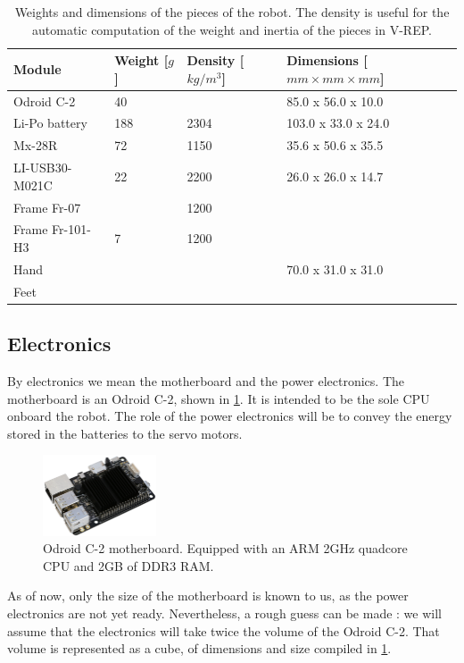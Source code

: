 \begin{table}[htp]
\center
\begin{tabularx}{\textwidth}{@{} l X X l @{}}
\toprule
\textbf{Module} & \textbf{Weight [$g$]} &  \textbf{Density [$kg/m^3$]}& \textbf{Dimensions [$mm \times mm \times mm$]}\\ 
\midrule
Odroid C-2 & 40 &  & 85.0 x 56.0 x 10.0\\
Li-Po battery & 188 & 2304 & 103.0 x 33.0 x 24.0\\
Mx-28R & 72 & 1150 & 35.6 x 50.6 x 35.5\\
LI-USB30-M021C & 22 & 2200 & 26.0 x 26.0 x 14.7\\
Frame Fr-07 & & 1200 & \\
Frame Fr-101-H3 & 7 & 1200 & \\
Hand & & & 70.0 x 31.0 x 31.0\\
Feet & & & \\
\bottomrule
\end{tabularx}
\caption[Weights and dimensions of the pieces of the robot]{Weights and dimensions of the pieces of the robot. The density is useful for the automatic computation of the weight and inertia of the pieces in V-REP.}
\label{table:weights}
\end{table}

\subsection{Electronics}
By electronics we mean the motherboard and the power electronics. The motherboard is an Odroid C-2, shown in \cref{fig:electronics}. It is intended to be the sole CPU onboard the robot. The role of the power electronics will be to convey the energy stored in the batteries to the servo motors. 

\begin{figure}[htp]
\center
\includegraphics[width=0.3\textwidth]{figures/odroid-c2}
\caption{Odroid C-2 motherboard. Equipped with an ARM 2GHz quadcore CPU and 2GB of DDR3 RAM.}
\label{fig:electronics}
\end{figure}

As of now, only the size of the motherboard is known to us, as the power electronics are not yet ready. Nevertheless, a rough guess can be made : we will assume that the electronics will take twice the volume of the Odroid C-2. That volume is represented as a cube, of dimensions and size compiled in \cref{table:weights}.

